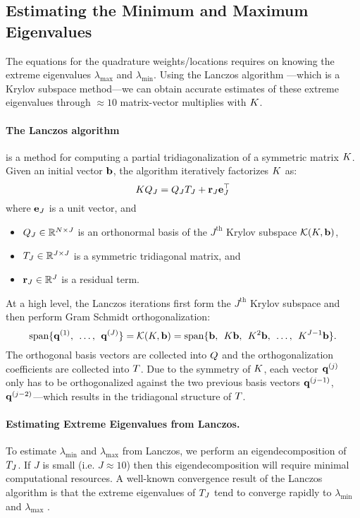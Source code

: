 \subsection{Estimating the Minimum and Maximum Eigenvalues}
The equations for the quadrature weights/locations requires on knowing the extreme eigenvalues $\lambda_\text{max}$ and $\lambda_\text{min}$.
Using the Lanczos algorithm \cite{lanczos1950iteration}---which is a Krylov subspace method---we can obtain accurate estimates of these extreme eigenvalues through $\approx 10$ matrix-vector multiplies with $K$.

\paragraph{The Lanczos algorithm}
is a method for computing a partial tridiagonalization of a symmetric matrix $K$.
Given an initial vector $\mathbf{b}$, the algorithm iteratively factorizes $K$ as:
\[
  K Q_J = Q_J T_J + \mathbf{r}_J \mathbf{e}_J^\top
\]
where $\mathbf{e}_J$ is a unit vector, and
%
\begin{itemize}
  \item $Q_J \in \mathbb{R}^{N \times J}$ is an orthonormal basis of the $J^\text{th}$ Krylov subspace $\mathcal{K}(K, \mathbf{b})$,
	\item $T_J \in \mathbb{R}^{J \times J}$ is a symmetric tridiagonal matrix, and
	\item $\mathbf{r}_J \in \mathbb{R}^J$ is a residual term.
\end{itemize}
%
At a high level, the Lanczos iterations first form the $J^\text{th}$ Krylov subspace and then perform Gram Schmidt orthogonalization:
\[
  \text{span} \{ \mathbf{q}^{(1)}, \:\: \ldots, \:\: \mathbf{q}^{(J)} \} = \mathcal{K}(K, \mathbf{b}) = \text{span} \{ \mathbf{b}, \:\: K\mathbf{b}, \:\: K^2\mathbf{b}, \:\: \ldots, \:\: K^{J-1} \mathbf{b} \}.
\]
The orthogonal basis vectors are collected into $Q$ and the orthogonalization coefficients are collected into $T$.
Due to the symmetry of $K$, each vector $\mathbf{q}^{(j)}$ only has to be orthogonalized against the two previous basis vectors $\mathbf{q}^{(j-1)}$, $\mathbf{q}^{(j-2)}$---which results in the tridiagonal structure of $T$.

\paragraph{Estimating Extreme Eigenvalues from Lanczos.}
To estimate $\lambda_\text{min}$ and $\lambda_\text{max}$ from Lanczos, we perform an eigendecomposition of $T_J$.
If $J$ is small (i.e. $J \approx 10$) then this eigendecomposition will require minimal computational resources.
A well-known convergence result of the Lanczos algorithm is that the extreme eigenvalues of $T_J$ tend to converge rapidly to $\lambda_\text{min}$ and $\lambda_\text{max}$ \cite[e.g.][]{saad2003iterative,golub2012matrix}.


